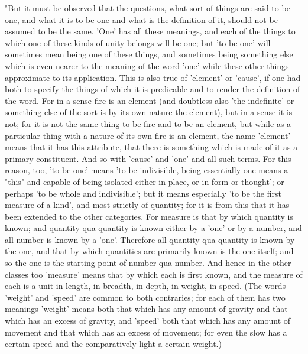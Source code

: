 "But it must be observed that the questions, what sort of things are
said to be one, and what it is to be one and what is the definition
of it, should not be assumed to be the same. 'One' has all these meanings,
and each of the things to which one of these kinds of unity belongs
will be one; but 'to be one' will sometimes mean being one of these
things, and sometimes being something else which is even nearer to
the meaning of the word 'one' while these other things approximate
to its application. This is also true of 'element' or 'cause', if
one had both to specify the things of which it is predicable and to
render the definition of the word. For in a sense fire is an element
(and doubtless also 'the indefinite' or something else of the sort
is by its own nature the element), but in a sense it is not; for it
is not the same thing to be fire and to be an element, but while as
a particular thing with a nature of its own fire is an element, the
name 'element' means that it has this attribute, that there is something
which is made of it as a primary constituent. And so with 'cause'
and 'one' and all such terms. For this reason, too, 'to be one' means
'to be indivisible, being essentially one means a "this" and capable
of being isolated either in place, or in form or thought'; or perhaps
'to be whole and indivisible'; but it means especially 'to be the
first measure of a kind', and most strictly of quantity; for it is
from this that it has been extended to the other categories. For measure
is that by which quantity is known; and quantity qua quantity is known
either by a 'one' or by a number, and all number is known by a 'one'.
Therefore all quantity qua quantity is known by the one, and that
by which quantities are primarily known is the one itself; and so
the one is the starting-point of number qua number. And hence in the
other classes too 'measure' means that by which each is first known,
and the measure of each is a unit-in length, in breadth, in depth,
in weight, in speed. (The words 'weight' and 'speed' are common to
both contraries; for each of them has two meanings-'weight' means
both that which has any amount of gravity and that which has an excess
of gravity, and 'speed' both that which has any amount of movement
and that which has an excess of movement; for even the slow has a
certain speed and the comparatively light a certain weight.)

